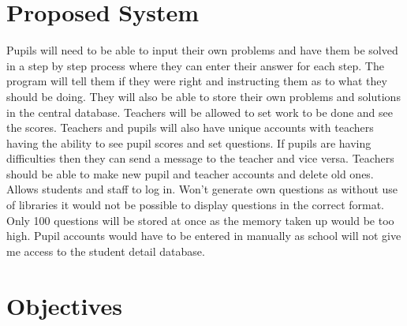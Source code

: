 \documentclass[a4paper,12pt]{report}
\begin{document}
\clearpage
\section{Proposed System}        

Pupils will need to be able to input their own problems and have them be solved in a step by step process where they can enter their answer for each step. The program will tell them if they were right and instructing them as to what they should be doing. They will also be able to store their own problems and solutions in the central database.  Teachers will be allowed to set work to be done and see the scores. Teachers and pupils will also have unique accounts with teachers having the ability to see pupil scores and set questions. If pupils are having difficulties then they can send a message to the teacher and vice versa. Teachers should be able to make new pupil and teacher accounts and delete old ones.  Allows students and staff to log in. Won’t generate own questions as without use of libraries it would not be possible to display questions in the correct format. Only 100 questions will be stored at once as the memory taken up would be too high. Pupil accounts would have to be entered in manually as school will not give me access to the student detail database.\\

\section{Objectives}
\end{document}
